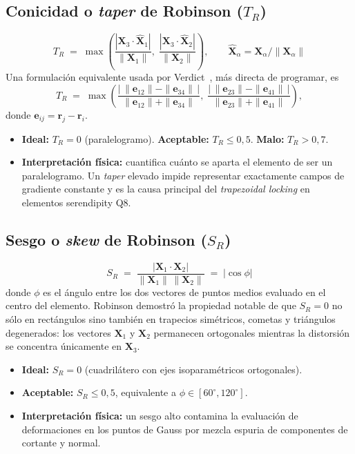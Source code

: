 \documentclass[11pt,a4paper]{article}
\begin{document}
\subsection{Conicidad o \emph{taper} de Robinson ($T_R$)}
\begin{equation}
\boxed{\;T_R \;=\; \max\!\left(\frac{|\mathbf{X}_3\cdot\hat{\mathbf{X}}_1|}{\|\mathbf{X}_1\|},\;\frac{|\mathbf{X}_3\cdot\hat{\mathbf{X}}_2|}{\|\mathbf{X}_2\|}\right),\qquad \hat{\mathbf{X}}_\alpha = \mathbf{X}_\alpha/\|\mathbf{X}_\alpha\|\;}
\label{eq:taper}
\end{equation}
Una formulaci\'on equivalente usada por Verdict~\cite{Verdict2007}, m\'as directa de programar, es
\begin{equation}
T_R \;=\; \max\!\left(\frac{\bigl|\,\|\mathbf{e}_{12}\|-\|\mathbf{e}_{34}\|\,\bigr|}{\|\mathbf{e}_{12}\|+\|\mathbf{e}_{34}\|},\;\frac{\bigl|\,\|\mathbf{e}_{23}\|-\|\mathbf{e}_{41}\|\,\bigr|}{\|\mathbf{e}_{23}\|+\|\mathbf{e}_{41}\|}\right),
\label{eq:taper_edges}
\end{equation}
donde $\mathbf{e}_{ij}=\mathbf{r}_j-\mathbf{r}_i$.
\begin{itemize}[leftmargin=1.2em]
  \item \textbf{Ideal:} $T_R = 0$ (paralelogramo). \textbf{Aceptable:} $T_R \le 0{,}5$. \textbf{Malo:} $T_R > 0{,}7$.
  \item \textbf{Interpretaci\'on f\'isica:} cuantifica cu\'anto se aparta el elemento de ser un paralelogramo. Un \emph{taper} elevado impide representar exactamente campos de gradiente constante y es la causa principal del \emph{trapezoidal locking} en elementos serendipity Q8.
\end{itemize}

\subsection{Sesgo o \emph{skew} de Robinson ($S_R$)}
\begin{equation}
\boxed{\;S_R \;=\; \frac{|\mathbf{X}_1\cdot\mathbf{X}_2|}{\|\mathbf{X}_1\|\,\|\mathbf{X}_2\|} \;=\; |\cos\phi|\;}
\label{eq:skew}
\end{equation}
donde $\phi$ es el \'angulo entre los dos vectores de puntos medios evaluado en el centro del elemento. Robinson demostr\'o la propiedad notable de que $S_R=0$ no s\'olo en rect\'angulos sino tambi\'en en trapecios sim\'etricos, cometas y tri\'angulos degenerados: los vectores $\mathbf{X}_1$ y $\mathbf{X}_2$ permanecen ortogonales mientras la distorsi\'on se concentra \'unicamente en $\mathbf{X}_3$.
\begin{itemize}[leftmargin=1.2em]
  \item \textbf{Ideal:} $S_R = 0$ (cuadril\'atero con ejes isoparam\'etricos ortogonales).
  \item \textbf{Aceptable:} $S_R \le 0{,}5$, equivalente a $\phi \in [60^\circ, 120^\circ]$.
  \item \textbf{Interpretaci\'on f\'isica:} un sesgo alto contamina la evaluaci\'on de deformaciones en los puntos de Gauss por mezcla espuria de componentes de cortante y normal.
\end{itemize}
\end{document}
